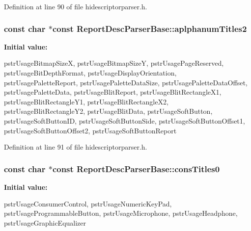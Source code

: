 \-Definition at line 90 of file hidescriptorparser.\-h.

\hypertarget{class_report_desc_parser_base_ae0090afb0e090b539fcaa4b71f099b08}{
\subsubsection[{aplphanum\-Titles2}]{\setlength{\rightskip}{0pt plus 5cm}const char $\ast$const {\bf \-Report\-Desc\-Parser\-Base\-::aplphanum\-Titles2}}}\label{class_report_desc_parser_base_ae0090afb0e090b539fcaa4b71f099b08}
{\bfseries \-Initial value\-:}
\begin{DoxyCode}
 {
        pstrUsageBitmapSizeX,
        pstrUsageBitmapSizeY,
        pstrUsagePageReserved,
        pstrUsageBitDepthFormat,
        pstrUsageDisplayOrientation,
        pstrUsagePaletteReport,
        pstrUsagePaletteDataSize,
        pstrUsagePaletteDataOffset,
        pstrUsagePaletteData,
        pstrUsageBlitReport,
        pstrUsageBlitRectangleX1,
        pstrUsageBlitRectangleY1,
        pstrUsageBlitRectangleX2,
        pstrUsageBlitRectangleY2,
        pstrUsageBlitData,
        pstrUsageSoftButton,
        pstrUsageSoftButtonID,
        pstrUsageSoftButtonSide,
        pstrUsageSoftButtonOffset1,
        pstrUsageSoftButtonOffset2,
        pstrUsageSoftButtonReport
}
\end{DoxyCode}


\-Definition at line 91 of file hidescriptorparser.\-h.

\hypertarget{class_report_desc_parser_base_a81af202145ab2899b222170b0d681213}{
\subsubsection[{cons\-Titles0}]{\setlength{\rightskip}{0pt plus 5cm}const char $\ast$const {\bf \-Report\-Desc\-Parser\-Base\-::cons\-Titles0}}}\label{class_report_desc_parser_base_a81af202145ab2899b222170b0d681213}
{\bfseries \-Initial value\-:}
\begin{DoxyCode}
 {
        pstrUsageConsumerControl,
        pstrUsageNumericKeyPad,
        pstrUsageProgrammableButton,
        pstrUsageMicrophone,
        pstrUsageHeadphone,
        pstrUsageGraphicEqualizer
}
\end{DoxyCode}


